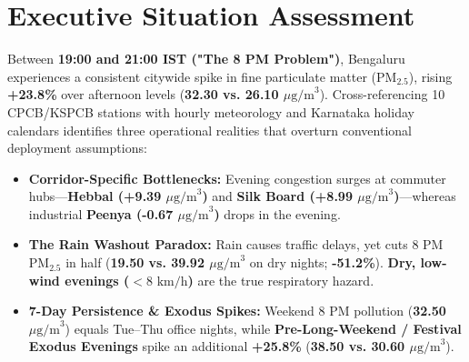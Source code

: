 \documentclass[10pt,a4paper]{article}
\begin{document}
\noindent{}

\vspace{5pt}

\noindent{}

\section{Executive Situation Assessment}
Between \textbf{19:00 and 21:00 IST ("The 8 PM Problem")}, Bengaluru experiences a consistent citywide spike in fine particulate matter ($\text{PM}_{2.5}$), rising \textbf{+23.8\%} over afternoon levels (\textbf{32.30 vs. 26.10 $\mu\text{g/m}^3$}). Cross-referencing 10 CPCB/KSPCB stations with hourly meteorology and Karnataka holiday calendars identifies three operational realities that overturn conventional deployment assumptions:

\begin{itemize}[leftmargin=1.4em, itemsep=1.5pt, topsep=2pt]
    \item \textbf{Corridor-Specific Bottlenecks:} Evening congestion surges at commuter hubs---\textbf{Hebbal (+9.39 $\mu\text{g/m}^3$)} and \textbf{Silk Board (+8.99 $\mu\text{g/m}^3$)}---whereas industrial \textbf{Peenya (-0.67 $\mu\text{g/m}^3$)} drops in the evening.
    \item \textbf{The Rain Washout Paradox:} Rain causes traffic delays, yet cuts 8 PM $\text{PM}_{2.5}$ in half (\textbf{19.50 vs. 39.92 $\mu\text{g/m}^3$} on dry nights; \textbf{-51.2\%}). \textbf{Dry, low-wind evenings ($<8\text{ km/h}$)} are the true respiratory hazard.
    \item \textbf{7-Day Persistence \& Exodus Spikes:} Weekend 8 PM pollution (\textbf{32.50 $\mu\text{g/m}^3$}) equals Tue--Thu office nights, while \textbf{Pre-Long-Weekend / Festival Exodus Evenings} spike an additional \textbf{+25.8\%} (\textbf{38.50 vs. 30.60 $\mu\text{g/m}^3$}).
\end{itemize}
\end{document}
